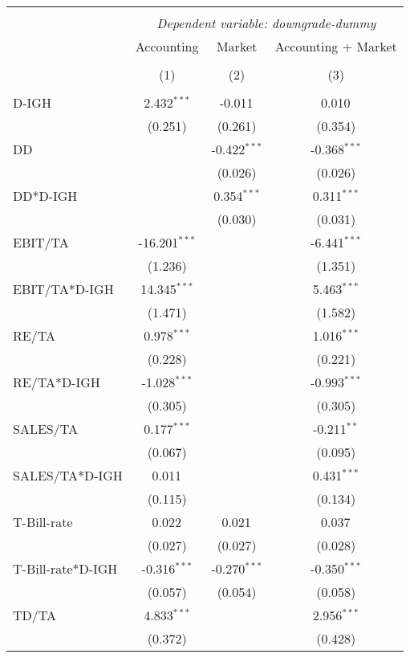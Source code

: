\begin{table}[!htbp] \centering
\begin{tabular}{@{\extracolsep{5pt}}lccc}
\\[-1.8ex]\hline
\hline \\[-1.8ex]
& \multicolumn{3}{c}{\textit{Dependent variable: downgrade-dummy}} \
\cr \cline{2-4}
\\[-1.8ex] & \multicolumn{1}{c}{Accounting} & \multicolumn{1}{c}{Market} & \multicolumn{1}{c}{Accounting + Market}  \\
\\[-1.8ex] & (1) & (2) & (3) \\
\hline \\[-1.8ex]
 D-IGH & 2.432$^{***}$ & -0.011$^{}$ & 0.010$^{}$ \\
& (0.251) & (0.261) & (0.354) \\
 DD & & -0.422$^{***}$ & -0.368$^{***}$ \\
& & (0.026) & (0.026) \\
 DD*D-IGH & & 0.354$^{***}$ & 0.311$^{***}$ \\
& & (0.030) & (0.031) \\
 EBIT/TA & -16.201$^{***}$ & & -6.441$^{***}$ \\
& (1.236) & & (1.351) \\
 EBIT/TA*D-IGH & 14.345$^{***}$ & & 5.463$^{***}$ \\
& (1.471) & & (1.582) \\
 RE/TA & 0.978$^{***}$ & & 1.016$^{***}$ \\
& (0.228) & & (0.221) \\
 RE/TA*D-IGH & -1.028$^{***}$ & & -0.993$^{***}$ \\
& (0.305) & & (0.305) \\
 SALES/TA & 0.177$^{***}$ & & -0.211$^{**}$ \\
& (0.067) & & (0.095) \\
 SALES/TA*D-IGH & 0.011$^{}$ & & 0.431$^{***}$ \\
& (0.115) & & (0.134) \\
 T-Bill-rate & 0.022$^{}$ & 0.021$^{}$ & 0.037$^{}$ \\
& (0.027) & (0.027) & (0.028) \\
 T-Bill-rate*D-IGH & -0.316$^{***}$ & -0.270$^{***}$ & -0.350$^{***}$ \\
& (0.057) & (0.054) & (0.058) \\
 TD/TA & 4.833$^{***}$ & & 2.956$^{***}$ \\
& (0.372) & & (0.428) \\

\end{tabular}
\end{table}
